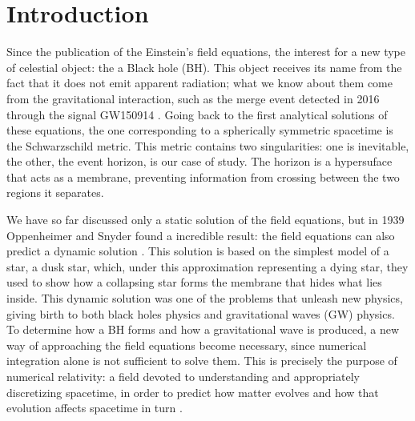 \chapter{Introduction} \label{cap:introduccion}


Since the publication of the Einstein's field equations, the interest for a new type of celestial object: the a Black hole (BH). This object receives its name from the fact that it does not emit apparent radiation; what we know about them come from the gravitational interaction, such as the merge event detected in 2016 through the signal GW150914 \cite{Abbott2016}. Going back to the first analytical solutions of these equations, the one corresponding to a spherically symmetric spacetime is the  Schwarzschild metric. This metric contains two singularities: one is inevitable, the other, the event horizon, is our case of study. The horizon is a hypersuface that acts as a membrane, preventing information from crossing between the two regions it separates. 

We have so far discussed only a static solution of the field equations, but in 1939 Oppenheimer and Snyder found a incredible result: the field equations can also predict a dynamic solution \cite{Oppenheimer-Snyder1939}. This solution is based on the simplest model of a star, a dusk star, which, under this approximation representing a dying star, they used to show how a collapsing star forms the membrane that hides what lies inside.  This dynamic solution was one of the problems that unleash new physics, giving birth to both black holes physics and gravitational waves (GW) physics. To determine how a BH forms and how a gravitational wave is produced, a new way of approaching the field equations become necessary, since numerical integration alone is not sufficient to solve them. This is precisely the purpose of numerical relativity: a field devoted to understanding and appropriately discretizing spacetime, in order to predict how matter evolves and how that evolution affects spacetime in turn \cite{baumgarte2021numerical}. 

